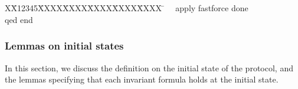 \documentclass[final]{IEEEtran}
\newlength{\fminilength}
\newenvironment{fmini}[1][\linewidth]
  {\setlength{\fminilength}{#1\fboxsep-2\fboxrule}%
   \vspace{2ex}\noindent\begin{lrbox}{\fminibox}\begin{minipage}{\fminilength}%
   \mbox{ }\hfill\vspace{-2.5ex}}%
  {\end{minipage}\end{lrbox}\vspace{1ex}\hspace{0ex}%
   \framebox{\usebox{\fminibox}}}
\newenvironment{specification}
{\noindent\scriptsize
\tt\begin{fmini}\begin{tabbing}X\=X12345\=XXXX\=XXXX\=XXXX\=XXXX\=XXXX
\=\+\kill} {\end{tabbing}\normalfont\end{fmini}}
\def \twoSpaces {\ \ }
\begin{document}
{\begin{specification}
\twoSpaces  apply fastforce done\\
qed
end\\
\end{specification}





\subsubsection{Lemmas on initial states}

In this section, we discuss the definition on the initial state of the protocol, and the lemmas specifying that each invariant formula holds at the initial state.

}
\end{document}
